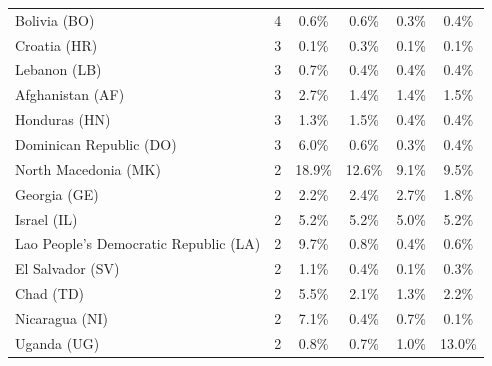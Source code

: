 {\begin{table}[ht]
{\begin{tabular}{lccccc}
Bolivia (BO)          &     4  & 0.6\% & 0.6\% & \cellcolor{green0} 0.3\% & 0.4\% \\  %
Croatia (HR)          &     3  & \cellcolor{green1} 0.1\% & \cellcolor{red5}  0.3\% & \cellcolor{green1} 0.1\% & \cellcolor{green1} 0.1\% \\  %
Lebanon (LB)          &     3  & \cellcolor{red5}  0.7\% & 0.4\% & 0.4\% & 0.4\% \\  %
Afghanistan (AF)      &     3  & \cellcolor{red2} 2.7\% & \cellcolor{green0} 1.4\% & \cellcolor{green0} 1.4\% & 1.5\% \\  %
Honduras (HN)         &     3  & 1.3\% & \cellcolor{red1} 1.5\% & \cellcolor{green1} 0.4\% & \cellcolor{green1} 0.4\% \\  %
Dominican Republic (DO)  &     3  & \cellcolor{red5}  6.0\% & \cellcolor{green0} 0.6\% & \cellcolor{green1} 0.3\% & \cellcolor{green0} 0.4\% \\  %
North Macedonia (MK)  &     2  & \cellcolor{red5}  18.9\% & \cellcolor{red2} 12.6\% & \cellcolor{red0} 9.1\% & \cellcolor{red0} 9.5\% \\  %
Georgia (GE)          &     2  & \cellcolor{red2} 2.2\% & \cellcolor{red5}  2.4\% & \cellcolor{red5}  2.7\% & \cellcolor{red1} 1.8\% \\  %
Israel (IL)           &     2  & \cellcolor{red5}  5.2\% & \cellcolor{red5}  5.2\% & \cellcolor{red2} 5.0\% & \cellcolor{red5}  5.2\% \\  %
Lao People's Democratic Republic (LA)  &     2  & \cellcolor{red5}  9.7\% & \cellcolor{green0} 0.8\% & \cellcolor{green1} 0.4\% & \cellcolor{green1} 0.6\% \\  %
El Salvador (SV)      &     2  & \cellcolor{red5}  1.1\% & 0.4\% & \cellcolor{green2} 0.1\% & \cellcolor{green0} 0.3\% \\  %
Chad (TD)             &     2  & \cellcolor{red5}  5.5\% & \cellcolor{red0} 2.1\% & 1.3\% & \cellcolor{red0} 2.2\% \\  %
Nicaragua (NI)        &     2  & \cellcolor{red5}  7.1\% & \cellcolor{green0} 0.4\% & 0.7\% & \cellcolor{green0} 0.1\% \\  %
Uganda (UG)           &     2  & \cellcolor{green0} 0.8\% & \cellcolor{green0} 0.7\% & \cellcolor{green0} 1.0\% & \cellcolor{red5}  13.0\% \\  %

\end{tabular}}
\end{table}}
